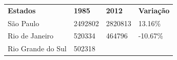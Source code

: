 \begin{longtable}[]{@{}
  >{\raggedright\arraybackslash}p{}
  >{\raggedright\arraybackslash}p{}
  >{\raggedright\arraybackslash}p{}
  >{\raggedright\arraybackslash}p{}@{}}
\toprule\noalign{}
\begin{minipage}[b]{\linewidth}\raggedright
\textbf{Estados}
\end{minipage} & \begin{minipage}[b]{\linewidth}\raggedright
\textbf{1985}
\end{minipage} & \begin{minipage}[b]{\linewidth}\raggedright
\textbf{2012}
\end{minipage} & \begin{minipage}[b]{\linewidth}\raggedright
\textbf{Variação}
\end{minipage} \\
\begin{minipage}[b]{\linewidth}\raggedright
São Paulo
\end{minipage} & \begin{minipage}[b]{\linewidth}\raggedright
2492802
\end{minipage} & \begin{minipage}[b]{\linewidth}\raggedright
2820813
\end{minipage} & \begin{minipage}[b]{\linewidth}\raggedright
13.16\%
\end{minipage} \\
\begin{minipage}[b]{\linewidth}\raggedright
Rio de Janeiro
\end{minipage} & \begin{minipage}[b]{\linewidth}\raggedright
520334
\end{minipage} & \begin{minipage}[b]{\linewidth}\raggedright
464796
\end{minipage} & \begin{minipage}[b]{\linewidth}\raggedright
-10.67\%
\end{minipage} \\
\begin{minipage}[b]{\linewidth}\raggedright
Rio Grande do Sul
\end{minipage} & \begin{minipage}[b]{\linewidth}\raggedright
502318
\end{minipage} & \begin{minipage}[b]{\linewidth}\raggedright

\end{minipage}
\end{longtable}
